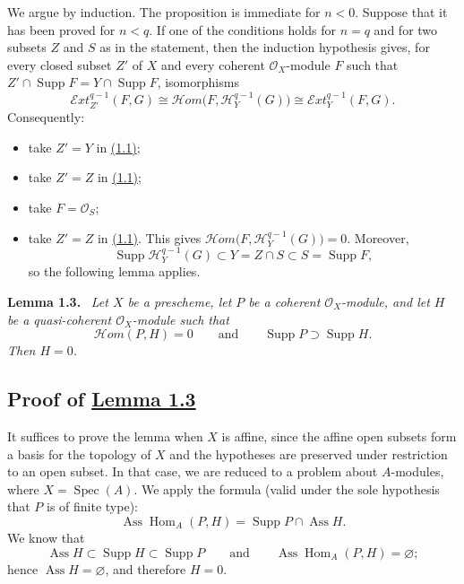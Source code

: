 \documentclass[11pt,a4paper,oneside]{book}
\providecommand{\sisi}[2]{#2}
\providecommand{\SheafH}{\mathcal H}
\providecommand{\SheafHom}{\mathcal H\!om}
\providecommand{\SheafExt}{\mathcal E\!xt}
\providecommand{\OX}{\mathcal O_X}
\providecommand{\Assop}{\operatorname{Ass}}
\providecommand{\Supp}{\operatorname{Supp}}
\providecommand{\Spec}{\operatorname{Spec}}
\providecommand{\Homop}{\operatorname{Hom}}
\newenvironment{sgastatement}[1]
  {\par\addvspace{0.8\baselineskip}\noindent\textbf{#1.}\ \itshape}
  {\par\addvspace{0.35\baselineskip}}
\theoremstyle{plain}
\theoremstyle{definition}
\theoremstyle{remark}
\begin{document}
We argue by induction. The proposition is immediate for $n<0$. Suppose that it
has been proved for $n<q$. If one of the conditions holds for $n=q$ and for two
subsets $Z$ and $S$ as in the statement, then the induction hypothesis gives,
for every closed subset $Z'$ of $X$ and every coherent $\OX$-module $F$ such
that $Z'\cap\Supp F=Y\cap\Supp F$, isomorphisms
\begin{equation}\tag{1.1}\label{eq:VII.1.1}
  \SheafExt_{Z'}^{q-1}(F,G)
  \cong\SheafHom\bigl(F,\SheafH_Y^{q-1}(G)\bigr)
  \cong\SheafExt_Y^{q-1}(F,G).
\end{equation}
Consequently:
\begin{itemize}
  \item[(i)$\Rightarrow$(iv)] take $Z'=Y$ in \hyperref[eq:VII.1.1]{(1.1)};
  \item[(iv)$\Rightarrow$(iii)] take $Z'=Z$ in \hyperref[eq:VII.1.1]{(1.1)};
  \item[(iii)$\Rightarrow$(ii)] take $F=\mathcal O_S$;
  \item[(ii)$\Rightarrow$(i)] take $Z'=Z$ in \hyperref[eq:VII.1.1]{(1.1)}. This gives
  $\SheafHom\bigl(F,\SheafH_Y^{q-1}(G)\bigr)=0$. Moreover,
  \[
    \Supp\SheafH_Y^{q-1}(G)
    \subset Y=Z\cap S\subset S=\Supp F,
  \]
  so the following lemma applies.
\end{itemize}

\begin{sgastatement}{Lemma 1.3}
Let $X$ be a prescheme, let $P$ be a coherent $\OX$-module, and let $H$ be a
quasi-coherent $\OX$-module such that
\[
  \SheafHom(P,H)=0
  \qquad\text{and}\qquad
  \Supp P\supset\Supp H.
\]
Then $H=0$.
\end{sgastatement}

\subsection*{Proof of \hyperref[VII.1.3]{Lemma 1.3}}
It suffices to prove the lemma when $X$ is affine, since the affine open
subsets form a basis for the topology of $X$ and the hypotheses are preserved
under restriction to an open subset. In that case, we are reduced to a problem
about $A$-modules, where $X=\Spec(A)$. We apply the formula (valid under the
sole hypothesis that $\sisi{M}{P}$ is of finite type):
\[
  \Assop\Homop_A(P,H)=\Supp P\cap\Assop H.
\]
We know that
\[
  \Assop H\subset\Supp H\subset\Supp P
  \qquad\text{and}\qquad
  \Assop\Homop_A(P,H)=\varnothing;
\]
hence $\Assop H=\varnothing$, and therefore $H=0$.
\end{document}
